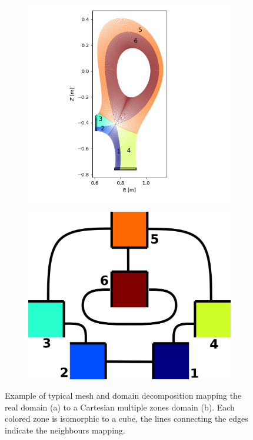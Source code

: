 \begin{figure}[H]\centering
	\begin{subfigure}[c]{0.5\textwidth}
		\centering
		\includegraphics[width=1\textwidth]{schemes/TCVmesh.png}
		\label{fig:TCVmesh}
	\end{subfigure}
	\begin{subfigure}[c]{0.3\textwidth}
		\centering
		\includegraphics[width=1\textwidth]{schemes/TCV_domains.png}
		\label{fig:TCV_domains}
	\end{subfigure}
	
	\caption[Example of typical mesh and domain decomposition mapping the real domain to a Cartesian multiple zones domain]{ Example of typical mesh and domain decomposition mapping the real domain (a) to a Cartesian multiple zones domain (b). Each colored zone is isomorphic to a cube, the lines connecting the edges indicate the neighbours mapping. }
	\label{fig:TCVzoneDecomposition}
\end{figure}

